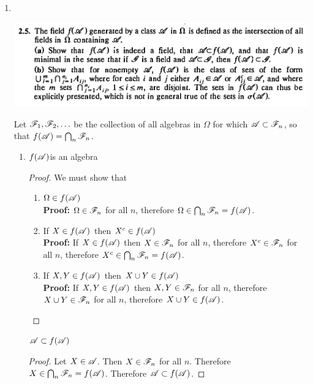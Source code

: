 \begin{enumerate}
  \newpage
\item~\\
  \begin{mdframed}
    \includegraphics[width=400pt]{img/analysis--berkeley-202a-hw-ab18.png}
  \end{mdframed}
  Let $\mathscr F_1, \mathscr F_2, \ldots$ be the collection of all algebras in $\Omega$ for which $\mathscr A \subset \mathscr F_n$,
  so that $f(\mathscr A) = \bigcap_{n}\mathscr F_n$.

  \begin{enumerate}[label=(\alph*)]

  \item
    \begin{claim*}
      $f(\mathscr A)$is an algebra
    \end{claim*}
    \begin{proof}
      We must show that
      \begin{enumerate}
      \item $\Omega \in f(\mathscr A)$\\
        {\bf Proof:} $\Omega \in \mathscr F_n$ for all $n$, therefore $\Omega \in \bigcap_{n}\mathscr F_n = f(\mathscr A)$.

      \item If $X \in f(\mathscr A)$ then $X^c \in f(\mathscr A)$\\
        {\bf Proof:} If $X \in f(\mathscr A)$ then $X \in \mathscr F_n$ for all $n$, therefore $X^c \in \mathscr F_n$ for all $n$, therefore $X^c \in \bigcap_{n}\mathscr F_n = f(\mathscr A)$.

      \item If $X, Y \in f(\mathscr A)$ then $X \cup Y \in f(\mathscr A)$\\
        {\bf Proof:} If $X, Y \in f(\mathscr A)$ then $X, Y \in \mathscr F_n$ for all $n$, therefore $X \cup Y \in \mathscr F_n$ for all $n$, therefore $X \cup Y \in f(\mathscr A)$.
      \end{enumerate}
    \end{proof}

    \begin{claim*}
      $\mathscr A \subset f(\mathscr A)$
    \end{claim*}
    \begin{proof}
      Let $X \in \mathscr A$. Then $X \in \mathscr F_n$ for all $n$. Therefore $X \in \bigcap_{n}\mathscr F_n = f(\mathscr A)$. Therefore $\mathscr A \subset f(\mathscr A)$.
    \end{proof}


\end{enumerate}
\end{enumerate}
